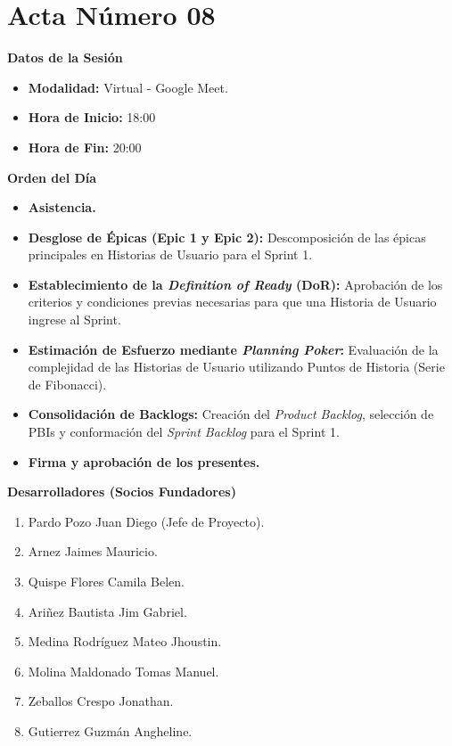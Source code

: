 \newpage
\section{Acta Número 08}
\label{sec:acta08}

\noindent \textbf{Datos de la Sesión}
\begin{itemize}[noitemsep]
    \item \textbf{Modalidad:} Virtual - Google Meet.
    \item \textbf{Hora de Inicio:} 18:00
    \item \textbf{Hora de Fin:} 20:00
\end{itemize}

\noindent \textbf{Orden del Día}
\begin{itemize}[noitemsep]
    \item \textbf{Asistencia.}
    \item \textbf{Desglose de Épicas (Epic 1 y Epic 2):} Descomposición de las épicas principales en Historias de Usuario para el Sprint 1.
    \item \textbf{Establecimiento de la \textit{Definition of Ready} (DoR):} Aprobación de los criterios y condiciones previas necesarias para que una Historia de Usuario ingrese al Sprint.
    \item \textbf{Estimación de Esfuerzo mediante \textit{Planning Poker}:} Evaluación de la complejidad de las Historias de Usuario utilizando Puntos de Historia (Serie de Fibonacci).
    \item \textbf{Consolidación de Backlogs:} Creación del \textit{Product Backlog}, selección de PBIs y conformación del \textit{Sprint Backlog} para el Sprint 1.
    \item \textbf{Firma y aprobación de los presentes.}
\end{itemize}

\noindent \textbf{Desarrolladores (Socios Fundadores)}
\begin{enumerate}[noitemsep]
    \item Pardo Pozo Juan Diego (Jefe de Proyecto).
    \item Arnez Jaimes Mauricio.
    \item Quispe Flores Camila Belen.
    \item Ariñez Bautista Jim Gabriel.
    \item Medina Rodríguez Mateo Jhoustin.
    \item Molina Maldonado Tomas Manuel.
    \item Zeballos Crespo Jonathan.
    \item Gutierrez Guzmán Angheline.
\end{enumerate}

